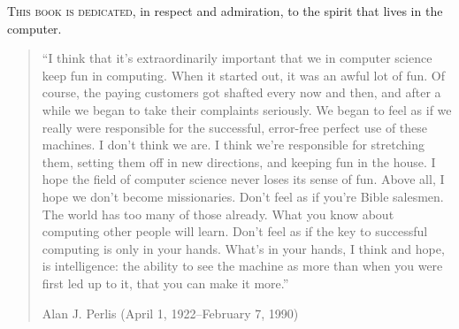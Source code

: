 \label{Dedication}

\lettrine{T}{his book is dedicated}, in respect and admiration, to the spirit that lives in
the computer.

\begin{quote}
“I think that it’s extraordinarily important that we in computer science keep
fun in computing.
When it started out, it was an awful lot of fun.
Of course, the paying customers got shafted every now and then, and after a while we began
to take their complaints seriously.
We began to feel as if we really were responsible for the successful, error-free perfect use of these machines.
I don’t think we are.
I think we're responsible for stretching them, setting them off in new directions, and keeping fun in the house.
I hope the field of computer science never loses its sense of fun.
Above all, I hope we don’t become missionaries.
Don’t feel as if you’re Bible salesmen.
The world has too many of those already.
What you know about computing other people will learn.
Don’t feel as if the key to successful computing is only in your hands.
What’s in your hands, I think and hope, is intelligence:
the ability to see the machine as more than when you were first led up to it, that you can make it more.”
\begin{flushleft}
	Alan J. Perlis (April 1, 1922--February 7, 1990)
\end{flushleft}
\end{quote}

